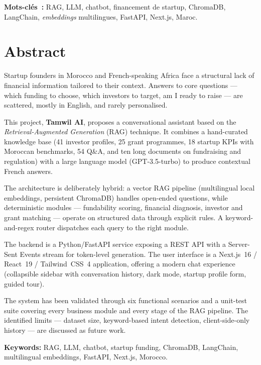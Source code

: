 \vspace{0.4cm}
\textbf{Mots-clés~:} RAG, LLM, chatbot, financement de startup, ChromaDB, LangChain, \textit{embeddings} multilingues, FastAPI, Next.js, Maroc.

\vspace{1.2cm}

\chapter*{Abstract}
\thispagestyle{plain}

Startup founders in Morocco and French-speaking Africa face a structural lack of financial information tailored to their context. Answers to core questions --- which funding to choose, which investors to target, am I ready to raise --- are scattered, mostly in English, and rarely personalised.

This project, \textbf{Tamwil AI}, proposes a conversational assistant based on the \emph{Retrieval-Augmented Generation} (RAG) technique. It combines a hand-curated knowledge base (41 investor profiles, 25 grant programmes, 18 startup KPIs with Moroccan benchmarks, 54 Q\&A, and ten long documents on fundraising and regulation) with a large language model (GPT-3.5-turbo) to produce contextual French answers.

The architecture is deliberately hybrid: a vector RAG pipeline (multilingual local embeddings, persistent ChromaDB) handles open-ended questions, while deterministic modules --- fundability scoring, financial diagnosis, investor and grant matching --- operate on structured data through explicit rules. A keyword-and-regex router dispatches each query to the right module.

The backend is a Python/FastAPI service exposing a REST API with a Server-Sent Events stream for token-level generation. The user interface is a Next.js~16 / React~19 / Tailwind~CSS~4 application, offering a modern chat experience (collapsible sidebar with conversation history, dark mode, startup profile form, guided tour).

The system has been validated through six functional scenarios and a unit-test suite covering every business module and every stage of the RAG pipeline. The identified limits --- dataset size, keyword-based intent detection, client-side-only history --- are discussed as future work.

\vspace{0.4cm}
\textbf{Keywords:} RAG, LLM, chatbot, startup funding, ChromaDB, LangChain, multilingual embeddings, FastAPI, Next.js, Morocco.
